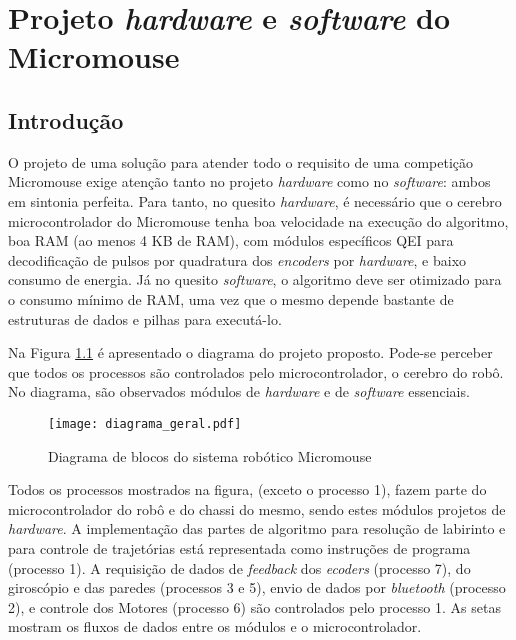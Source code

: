 \chapter{\textbf{Projeto \textit{hardware} e \textit{software} do Micromouse}}\label{ProjetoDosModulos}

\section{Introdução}
O projeto de uma solução para atender todo o requisito de uma competição Micromouse exige atenção tanto no projeto \textit{hardware} como no \textit{software}: ambos em sintonia perfeita. Para tanto, no quesito \emph{hardware}, é necessário que o cerebro microcontrolador do Micromouse tenha boa velocidade na execução do algoritmo, boa RAM (ao menos 4 KB de RAM), com módulos específicos QEI para decodificação de pulsos por quadratura dos \emph{encoders} por \textit{hardware}, e baixo consumo de energia. Já no quesito \emph{software}, o algoritmo deve ser otimizado para o consumo mínimo de RAM, uma vez que o mesmo depende bastante de estruturas de dados e pilhas para executá-lo.

Na Figura \ref{fig:system_completo} é apresentado o diagrama do projeto proposto. Pode-se perceber que todos os processos são controlados pelo microcontrolador, o cerebro do robô. No diagrama, são observados módulos de \emph{hardware} e de \emph{software} essenciais. 

\begin{figure}[!htb]
	\caption{\label{fig:system_completo}Diagrama de blocos do sistema robótico Micromouse}
	\begin{center}
		\texttt{[image: diagrama\_geral.pdf]}
	\end{center}
\end{figure}

Todos os processos mostrados na figura, (exceto o processo 1), fazem parte do microcontrolador do robô e do chassi do mesmo, sendo estes módulos projetos de \textit{hardware}. A implementação das partes de algoritmo para resolução de labirinto e para controle de trajetórias está representada como instruções de programa (processo 1). A requisição de dados de \emph{feedback} dos \emph{ecoders} (processo 7), do giroscópio e das paredes (processos 3 e 5), envio de dados por \textit{bluetooth} (processo 2), e controle dos Motores (processo 6) são controlados pelo processo 1. As setas mostram os fluxos de dados entre os módulos e o microcontrolador.

